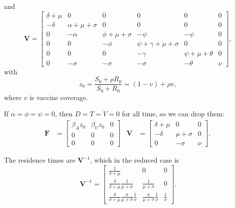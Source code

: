 \documentclass{article}
\newcommand{\mat}[1]{\mathbf{#1}}
\begin{document}
and
\begin{equation}
  \mat{V} =
  \begin{bmatrix}
    \delta + \mu & 0 & 0 & 0 & 0 & 0
    \\
    - \delta & \alpha + \mu + \sigma & 0 & 0 & 0 & 0
    \\
    0 & - \alpha & \phi + \mu + \sigma & - \psi & - \psi & 0
    \\
    0 & 0 & - \phi & \psi + \gamma + \mu + \sigma & 0 & 0
    \\
    0 & 0 & 0 & - \gamma & \psi + \mu + \theta & 0
    \\
    0 & - \sigma & - \sigma & - \sigma & - \theta & \nu
  \end{bmatrix},
\end{equation}
with
\begin{equation}
  z_0 = \frac{S_0 + \rho R_0}{S_0 + R_0}
  = (1 - v) + \rho v,
\end{equation}
where $v$ is vaccine coverage.

If $\alpha = \phi = \psi = 0$, then $D = T = V = 0$ for all time, so
we can drop them:
\begin{align}
  \mat{F}
  &=
  \begin{bmatrix}
    \beta_A z_0 & \beta_U z_0 & 0
    \\
    0 & 0 & 0
    \\
    0 & 0 & 0
  \end{bmatrix}
  &
  \mat{V} &=
  \begin{bmatrix}
    \delta + \mu & 0 & 0
    \\
    - \delta & \mu + \sigma & 0
    \\
    0 & - \sigma & \nu
  \end{bmatrix},
\end{align}

The residence times are $\mat{V}^{-1}$, which in the reduced case is
\begin{equation}
  \mat{V}^{-1} =
  \begin{bmatrix}
    \frac{1}{\delta + \mu} & 0 & 0
    \\
    \frac{\delta}{\delta + \mu} \frac{1}{\mu + \sigma}
    & \frac{1}{\mu + \sigma} & 0
    \\
    \frac{\delta}{\delta + \mu} \frac{\sigma}{\mu + \sigma}
    \frac{1}{\nu}
    & \frac{\sigma}{\mu + \sigma} \frac{1}{\nu} &\frac{1}{\nu}
  \end{bmatrix}.
\end{equation}
\end{document}
